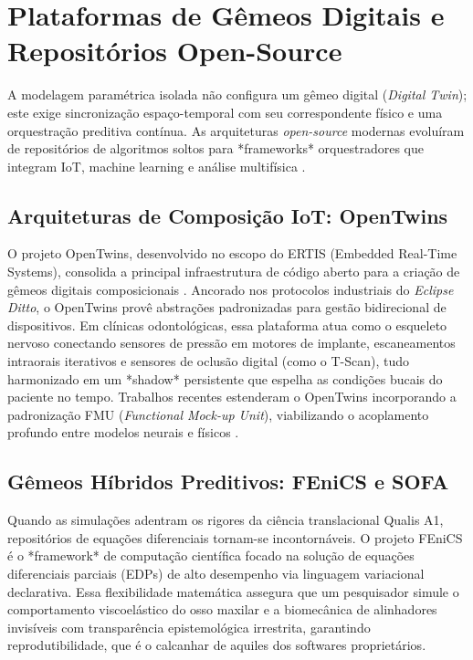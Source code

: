 \section{Plataformas de Gêmeos Digitais e Repositórios Open-Source}

A modelagem paramétrica isolada não configura um gêmeo digital (\textit{Digital Twin}); este exige sincronização espaço-temporal com seu correspondente físico e uma orquestração preditiva contínua. As arquiteturas \textit{open-source} modernas evoluíram de repositórios de algoritmos soltos para *frameworks* orquestradores que integram IoT, machine learning e análise multifísica \cite{katsoulakis2024digital, digital2025convergence}. 


\subsection{Arquiteturas de Composição IoT: OpenTwins}
O projeto OpenTwins, desenvolvido no escopo do ERTIS (Embedded Real-Time Systems), consolida a principal infraestrutura de código aberto para a criação de gêmeos digitais composicionais \cite{robles2023opentwins}. Ancorado nos protocolos industriais do \textit{Eclipse Ditto}, o OpenTwins provê abstrações padronizadas para gestão bidirecional de dispositivos. Em clínicas odontológicas, essa plataforma atua como o esqueleto nervoso conectando sensores de pressão em motores de implante, escaneamentos intraorais iterativos e sensores de oclusão digital (como o T-Scan), tudo harmonizado em um *shadow* persistente que espelha as condições bucais do paciente no tempo. Trabalhos recentes estenderam o OpenTwins incorporando a padronização FMU (\textit{Functional Mock-up Unit}), viabilizando o acoplamento profundo entre modelos neurais e físicos \cite{infante2024integrating}.

\subsection{Gêmeos Híbridos Preditivos: FEniCS e SOFA}
Quando as simulações adentram os rigores da ciência translacional Qualis A1, repositórios de equações diferenciais tornam-se incontornáveis. O projeto FEniCS é o *framework* de computação científica focado na solução de equações diferenciais parciais (EDPs) de alto desempenho via linguagem variacional declarativa. Essa flexibilidade matemática assegura que um pesquisador simule o comportamento viscoelástico do osso maxilar e a biomecânica de alinhadores invisíveis \cite{zhang2024recursive, li2024aligner} com transparência epistemológica irrestrita, garantindo reprodutibilidade, que é o calcanhar de aquiles dos softwares proprietários.

